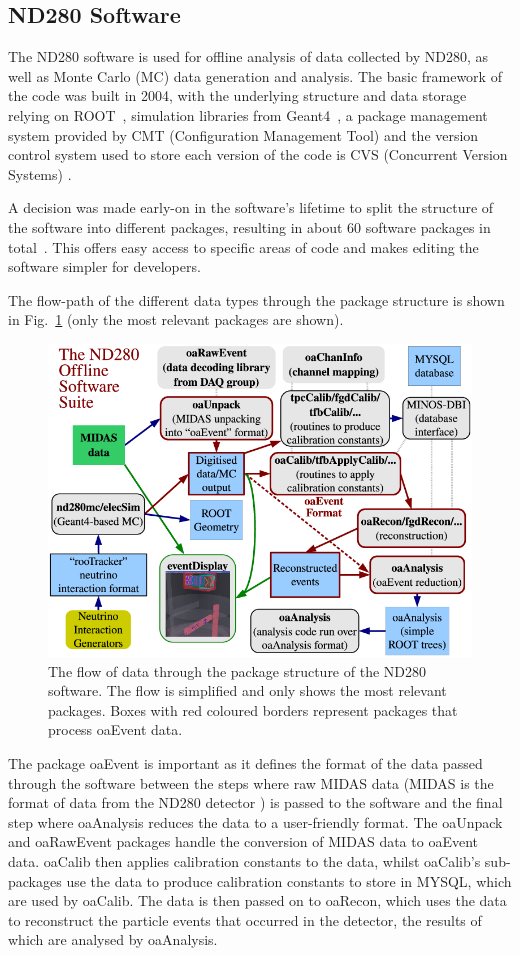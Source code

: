 \documentclass[aps,pra,12pt,notitlepage,tightenlines]{revtex4-1}
\begin{document}
\subsection{ND280 Software}
The ND280 software is used for offline analysis of data collected by ND280, as well as Monte Carlo (MC) data generation and analysis. The basic framework of the code was built in 2004, with the underlying structure and data storage relying on ROOT~\cite{Brun1997}, simulation libraries from Geant4~\cite{Agostinelli2003}, a package management system provided by CMT (Configuration Management Tool) \cite{Arnault:2000vu} and the version control system used to store each version of the code is CVS (Concurrent Version Systems) \cite{Berliner2001}.

A decision was made early-on in the software's lifetime to split the structure of the software into different packages, resulting in about 60 software packages in total~\cite{ABE2011106}. This offers easy access to specific areas of code and makes editing the software simpler for developers. 

The flow-path of the different data types through the package structure is shown in Fig.\ \ref{fig:struct} (only the most relevant packages are shown). 
\begin{figure}
 \includegraphics[scale=0.5]{struct.png}
 \caption{The flow of data through the package structure of the ND280 software. The flow is simplified and only shows the most relevant packages. Boxes with red coloured borders represent packages that process oaEvent data.~\cite{ABE2011106}}
 \label{fig:struct}
\end{figure}
The package oaEvent is important as it defines the format of the data passed through the software between the steps where raw MIDAS data (MIDAS is the format of data from the ND280 detector \cite{Ritt2001}) is passed to the software and the final step where oaAnalysis reduces the data to a user-friendly format. The oaUnpack and oaRawEvent packages handle the conversion of MIDAS data to oaEvent data. oaCalib then applies calibration constants to the data, whilst oaCalib's sub-packages use the data to produce calibration constants to store in MYSQL, which are used by oaCalib. The data is then passed on to oaRecon, which uses the data to reconstruct the particle events that occurred in the detector, the results of which are analysed by oaAnalysis.
\end{document}
